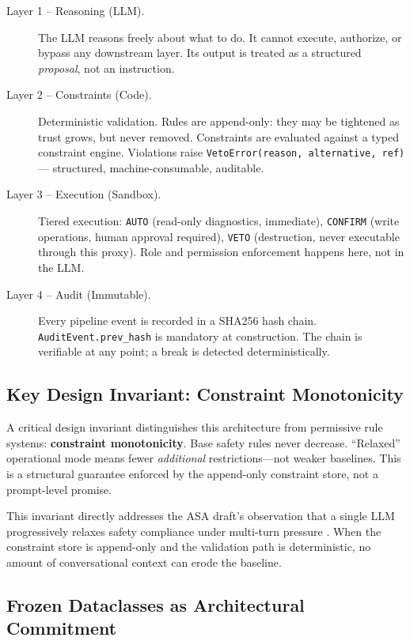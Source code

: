\documentclass[letterpaper]{article}
\begin{document}
\begin{description}
\item[Layer 1 -- Reasoning (LLM).] The LLM reasons freely about what to do.
      It cannot execute, authorize, or bypass any downstream layer.  Its output
      is treated as a structured \textit{proposal}, not an instruction.
\item[Layer 2 -- Constraints (Code).] Deterministic validation.  Rules are
      append-only: they may be tightened as trust grows, but never removed.
      Constraints are evaluated against a typed constraint engine.
      Violations raise \texttt{VetoError(reason, alternative, ref)} ---
      structured, machine-consumable, auditable.
\item[Layer 3 -- Execution (Sandbox).] Tiered execution:
      \texttt{AUTO} (read-only diagnostics, immediate),
      \texttt{CONFIRM} (write operations, human approval required),
      \texttt{VETO} (destruction, never executable through this proxy).
      Role and permission enforcement happens here, not in the LLM.
\item[Layer 4 -- Audit (Immutable).] Every pipeline event is recorded in a
      SHA256 hash chain.  \texttt{AuditEvent.prev\_hash} is mandatory at
      construction.  The chain is verifiable at any point; a break is detected
      deterministically.
\end{description}

\subsection{Key Design Invariant: Constraint Monotonicity}

A critical design invariant distinguishes this architecture from permissive
rule systems: \textbf{constraint monotonicity}.  Base safety rules never
decrease.  ``Relaxed'' operational mode means fewer \textit{additional}
restrictions---not weaker baselines.  This is a structural guarantee enforced
by the append-only constraint store, not a prompt-level promise.

This invariant directly addresses the ASA draft's observation that a single
LLM progressively relaxes safety compliance under multi-turn pressure
\cite{baysal2026}.  When the constraint store is append-only and the
validation path is deterministic, no amount of conversational context can
erode the baseline.

\subsection{Frozen Dataclasses as Architectural Commitment}
\end{document}
